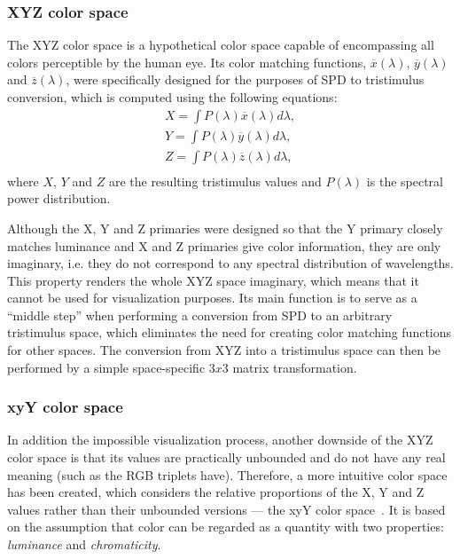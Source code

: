 \subsubsection{XYZ color space}

The XYZ color space is a hypothetical color space capable of encompassing all colors perceptible by the human eye. Its color matching functions, $\overline{x}(\lambda)$, $\overline{y}(\lambda)$ and $\overline{z}(\lambda)$, were specifically designed for the purposes of SPD to tristimulus conversion, which is computed using the following equations:
\begin{equation} \label{spdToXYZ}
	\begin{aligned}
	X=\int P(\lambda)\overline{x}(\lambda)d\lambda,\\
	Y=\int P(\lambda)\overline{y}(\lambda)d\lambda,\\
	Z=\int P(\lambda)\overline{z}(\lambda)d\lambda,\\
	\end{aligned}
\end{equation}
where $X$, $Y$ and $Z$ are the resulting tristimulus values and $P(\lambda)$ is the spectral power distribution.

Although the X, Y and Z primaries were designed so that the Y primary closely matches luminance and X and Z primaries give color information, they are only imaginary, i.e. they do not correspond to any spectral distribution of wavelengths. This property renders the whole XYZ space imaginary, which means that it cannot be used for visualization purposes. Its main function is to serve as a ``middle step'' when performing a conversion from SPD to an arbitrary tristimulus space, which eliminates the need for creating color matching functions for other spaces. The conversion from XYZ into a tristimulus space can then be performed by a simple space-specific $3x3$ matrix transformation.

\subsubsection{xyY color space} \label{sssect:xyYcolorSpace}

In addition the impossible visualization process, another downside of the XYZ color space is that its values are practically unbounded and do not have any real meaning (such as the RGB triplets have). Therefore, a more intuitive color space has been created, which considers the relative proportions of the X, Y and Z values rather than their unbounded versions --- the xyY color space~\cite{xyYOverview}. It is based on the assumption that color can be regarded as a quantity with two properties: \emph{luminance} and \emph{chromaticity}.

